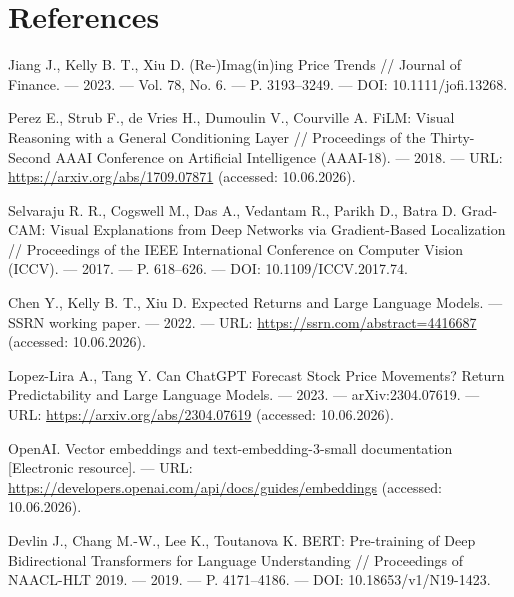 \documentclass[14pt,a4paper]{extarticle}
\begin{document}
\clearpage

\section*{References}

\begingroup
\small
\sloppy
\begin{enumerate}[label={[\arabic*]},leftmargin=1.1cm,itemsep=0.35em]
\item Jiang J., Kelly B. T., Xiu D. (Re-)Imag(in)ing Price Trends // Journal of Finance. --- 2023. --- Vol. 78, No. 6. --- P. 3193--3249. --- DOI: 10.1111/jofi.13268.

\item Perez E., Strub F., de Vries H., Dumoulin V., Courville A. FiLM: Visual Reasoning with a General Conditioning Layer // Proceedings of the Thirty-Second AAAI Conference on Artificial Intelligence (AAAI-18). --- 2018. --- URL: \url{https://arxiv.org/abs/1709.07871} (accessed: 10.06.2026).

\item Selvaraju R. R., Cogswell M., Das A., Vedantam R., Parikh D., Batra D. Grad-CAM: Visual Explanations from Deep Networks via Gradient-Based Localization // Proceedings of the IEEE International Conference on Computer Vision (ICCV). --- 2017. --- P. 618--626. --- DOI: 10.1109/ICCV.2017.74.

\item Chen Y., Kelly B. T., Xiu D. Expected Returns and Large Language Models. --- SSRN working paper. --- 2022. --- URL: \url{https://ssrn.com/abstract=4416687} (accessed: 10.06.2026).

\item Lopez-Lira A., Tang Y. Can ChatGPT Forecast Stock Price Movements? Return Predictability and Large Language Models. --- 2023. --- arXiv:2304.07619. --- URL: \url{https://arxiv.org/abs/2304.07619} (accessed: 10.06.2026).

\item OpenAI. Vector embeddings and text-embedding-3-small documentation [Electronic resource]. --- URL: \url{https://developers.openai.com/api/docs/guides/embeddings} (accessed: 10.06.2026).

\item Devlin J., Chang M.-W., Lee K., Toutanova K. BERT: Pre-training of Deep Bidirectional Transformers for Language Understanding // Proceedings of NAACL-HLT 2019. --- 2019. --- P. 4171--4186. --- DOI: 10.18653/v1/N19-1423.


\end{enumerate}
\end{document}

